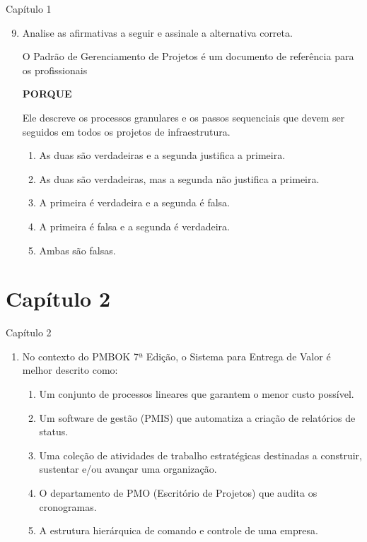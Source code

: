 \documentclass{beamer}
\begin{document}
\begin{frame}{Capítulo 1}
	\begin{enumerate}
		\setcounter{enumi}{8}
		\justifying
		\item Analise as afirmativas a seguir e assinale a alternativa correta.
		
		\vspace{10pt}
		O Padrão de Gerenciamento de Projetos é um documento de referência para os profissionais
		
		\vspace{10pt}
		\centering \textbf{PORQUE}
		
		\vspace{10pt}
		\justifying
		Ele descreve os processos granulares e os passos sequenciais que devem ser seguidos em todos os projetos de infraestrutura.
		
		\vspace{10pt}
		\begin{enumerate}[a]
			\item As duas são verdadeiras e a segunda justifica a primeira.
			\item As duas são verdadeiras, mas a segunda não justifica a primeira.
			\item \alert<2>{A primeira é verdadeira e a segunda é falsa}.
			\item A primeira é falsa e a segunda é verdadeira.
			\item Ambas são falsas.
		\end{enumerate}
	\end{enumerate}
\end{frame}

\section{Capítulo 2}

\begin{frame}{Capítulo 2}
	\begin{enumerate}
		\justifying
		\item No contexto do PMBOK 7ª Edição, o Sistema para Entrega de Valor é melhor descrito como:
		\begin{enumerate}[a]
			\item Um conjunto de processos lineares que garantem o menor custo possível.
			\item Um software de gestão (PMIS) que automatiza a criação de relatórios de status.
			\item \alert<2>{Uma coleção de atividades de trabalho estratégicas destinadas a construir, sustentar e/ou avançar uma organização}.
			\item O departamento de PMO (Escritório de Projetos) que audita os cronogramas.
			\item A estrutura hierárquica de comando e controle de uma empresa.
		\end{enumerate}
	\end{enumerate}
\end{frame}
\end{document}
